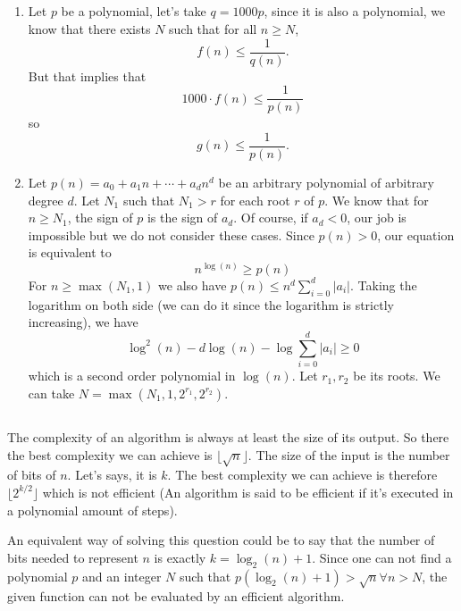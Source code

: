 \subsection{}
\begin{solution}
  \begin{enumerate}
    \item Let $p$ be a polynomial,
      let's take $q = 1000p$,
      since it is also a polynomial, we know
      that there exists $N$ such that for all $n \geq N$,
      \[ f(n) \leq \frac{1}{q(n)}. \]
      But that implies that
      \[ 1000 \cdot f(n) \leq \frac{1}{p(n)} \]
      so
      \[ g(n) \leq \frac{1}{p(n)}. \]
    \item Let $p(n) = a_0 + a_1 n + \cdots + a_dn^d$ be an
      arbitrary polynomial of arbitrary degree $d$.
      Let $N_1$ such that $N_1 > r$ for each root $r$ of $p$.
      We know that for $n \geq N_1$, the sign of $p$ is the sign of $a_d$.
      Of course, if $a_d < 0$, our job is impossible but we do not consider these cases.
      Since $p(n) > 0$, our equation is equivalent to
      \[ n^{\log(n)} \geq p(n) \]
      For $n \geq \max(N_1,1)$ we also have
      $p(n) \leq n^d \sum_{i=0}^d|a_i|$.
      Taking the logarithm on both side (we can do it since the logarithm is strictly increasing),
      we have
      \[ \log^2(n) - d \log(n) - \log\sum_{i=0}^d|a_i| \geq 0 \]
      which is a second order polynomial in $\log(n)$.
      Let $r_1,r_2$ be its roots.
      We can take $N = \max(N_1,1,2^{r_1},2^{r_2})$.
  \end{enumerate}
\end{solution}

\subsection{}
\begin{solution}
  The complexity of an algorithm is always at least
  the size of its output.
  So there the best complexity we can achieve is $\lfloor\sqrt{n}\rfloor$.
  The size of the input is the number of bits of $n$.
  Let's says, it is $k$.
  The best complexity we can achieve is therefore
  $\lfloor2^{k/2}\rfloor$ which is not efficient (An algorithm is said to be efficient if it's executed in a polynomial amount of steps).
  
  An equivalent way of solving this question could be to say that the
  number of bits needed to represent $n$ is exactly $k = \log_2(n) + 1$.
  Since one can not find a polynomial $p$ and an integer $N$
  such that $p(\log_2(n) + 1) > \sqrt{n} \forall n > N$, the given function
  can not be evaluated by an efficient algorithm.
\end{solution}

